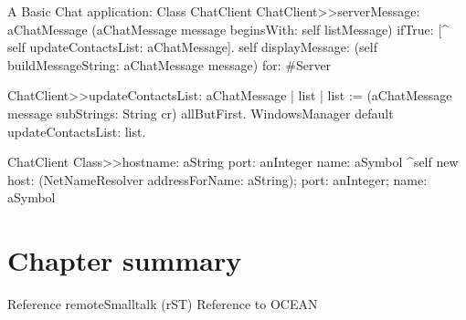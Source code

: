 \documentclass[a4paper,10pt,twoside]{book}
\begin{document}
\begin{script}{A Basic Chat application: Class ChatClient}
ChatClient>>serverMessage: aChatMessage
	(aChatMessage message beginsWith: self listMessage)
		ifTrue: [^ self updateContactsList: aChatMessage].
	self displayMessage: (self buildMessageString: aChatMessage message) for: #Server

ChatClient>>updateContactsList: aChatMessage
	| list |
	list := (aChatMessage message subStrings: String cr) allButFirst.
	WindowsManager default updateContactsList: list.

ChatClient Class>>hostname: aString port: anInteger name: aSymbol
	^self new 
		host: (NetNameResolver addressForName: aString);
		port: anInteger;
		name: aSymbol

\end{script}

\section{Chapter summary}
Reference remoteSmalltalk (rST)
Reference to OCEAN

\ifx\wholebook\relax\else
\end{document}
